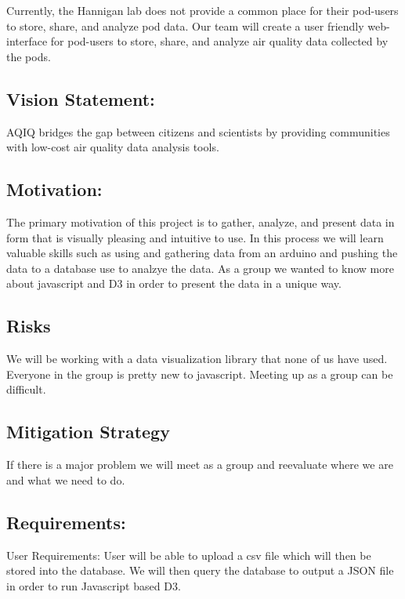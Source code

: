 Currently, the Hannigan lab does not provide a common place for their pod-\/users to store, share, and analyze pod data. Our team will create a user friendly web-\/interface for pod-\/users to store, share, and analyze air quality data collected by the pods.

\subsection*{Vision Statement\+:}

A\+Q\+IQ bridges the gap between citizens and scientists by providing communities with low-\/cost air quality data analysis tools.

\subsection*{Motivation\+:}

The primary motivation of this project is to gather, analyze, and present data in form that is visually pleasing and intuitive to use. In this process we will learn valuable skills such as using and gathering data from an arduino and pushing the data to a database use to analzye the data. As a group we wanted to know more about javascript and D3 in order to present the data in a unique way.

\subsection*{Risks}

We will be working with a data visualization library that none of us have used. Everyone in the group is pretty new to javascript. Meeting up as a group can be difficult.

\subsection*{Mitigation Strategy}

If there is a major problem we will meet as a group and reevaluate where we are and what we need to do.

\subsection*{Requirements\+:}

User Requirements\+: User will be able to upload a csv file which will then be stored into the database. We will then query the database to output a J\+S\+ON file in order to run Javascript based D3.

